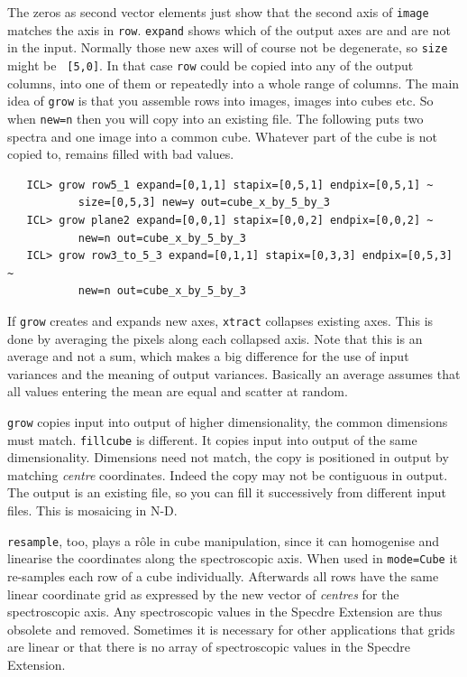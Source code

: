 \documentclass[11pt,twoside]{article}
\newcommand{\htmlref}[2]{#1}
\begin{document}
   The zeros as second vector elements just show that the second axis of
   {\tt image} matches the axis in {\tt row}.  {\tt expand} shows which
   of the output axes are and are not in the input.  Normally those new
   axes will of course not be degenerate, so {\tt size} might be {\tt
   [5,0]}.  In that case {\tt row} could be copied into any of the
   output columns, into one of them or repeatedly into a whole range of
   columns.  The main idea of {\tt grow} is that you assemble rows into
   images, images into cubes etc.  So when {\tt new=n} then you will
   copy into an existing file.  The following puts two spectra and one
   image into a common cube.  Whatever part of the cube is not copied
   to, remains filled with bad values.

\begin{verbatim}
   ICL> grow row5_1 expand=[0,1,1] stapix=[0,5,1] endpix=[0,5,1] ~
           size=[0,5,3] new=y out=cube_x_by_5_by_3
   ICL> grow plane2 expand=[0,0,1] stapix=[0,0,2] endpix=[0,0,2] ~
           new=n out=cube_x_by_5_by_3
   ICL> grow row3_to_5_3 expand=[0,1,1] stapix=[0,3,3] endpix=[0,5,3] ~
           new=n out=cube_x_by_5_by_3
\end{verbatim}


   If {\tt grow} creates and expands new axes,
{\tt\htmlref{xtract}{XTRACT}}
   collapses existing axes.  This is done by averaging the pixels along
   each collapsed axis.  Note that this is an average and not a sum,
   which makes a big difference for the use of input variances and the
   meaning of output variances.  Basically an average assumes that all
   values entering the mean are equal and scatter at random.

   {\tt grow} copies input into output of higher dimensionality, the
   common dimensions must match.
{\tt\htmlref{fillcube}{FILLCUBE}}
   is different.  It copies input into output of the same
   dimensionality.  Dimensions need not match, the copy is positioned in
   output by matching {\it centre} coordinates.  Indeed the copy may not
   be contiguous in output.  The output is an existing file, so you can
   fill it successively from different input files.  This is mosaicing
   in N-D.

{\tt\htmlref{resample}{RESAMPLE}},
   too, plays a r\^ole in cube manipulation, since it can homogenise and
   linearise the coordinates along the spectroscopic axis.  When used in
   {\tt mode=Cube} it re-samples each row of a cube individually.
   Afterwards all rows have the same linear coordinate grid as expressed
   by the new vector of {\it centres} for the spectroscopic axis.  Any
   spectroscopic values in the Specdre Extension are thus obsolete and
   removed.  Sometimes it is necessary for other applications that grids
   are linear or that there is no array of spectroscopic values in the
   Specdre Extension.
\end{document}
